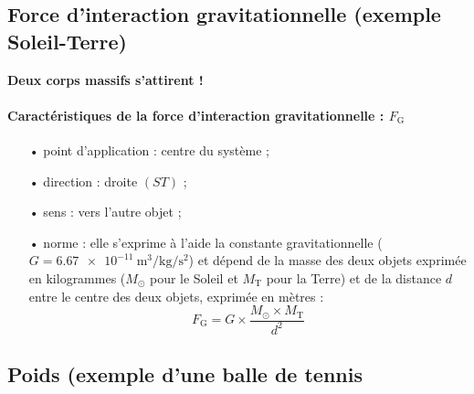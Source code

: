 \documentclass[12pt,a4paper,fleqn]{article}
\begin{document}
\subsection{Force d'interaction gravitationnelle (exemple Soleil-Terre)}

\textbf{Deux corps massifs s'attirent !}

\begin{center}
\end{center}

\paragraph{Caractéristiques de la force d'interaction gravitationnelle : $F_\mathrm{G}$}
\begin{itemize}
\item[•] point d'application : centre du système ;
\item[•] direction : droite $(ST)$ ;
\item[•] sens : vers l'autre objet ;
\item[•] norme : elle s'exprime à l'aide la constante gravitationnelle ($G = \qty[per-mode=power, inter-unit-product=\cdot]{6,67e-11}{\meter\cubed\per\kilogram\per\second\squared}$) et dépend de la masse des deux objets exprimée en kilogrammes ($M_\odot$ pour le Soleil et $M_\mathrm{T}$ pour la Terre) et de la distance $d$ entre le centre des deux objets, exprimée en mètres :
\[F_\mathrm{G} = G \times \frac{M_\odot \times M_\mathrm{T}}{d^2}\]
\end{itemize}

\subsection{Poids (exemple d'une balle de tennis}
\end{document}
